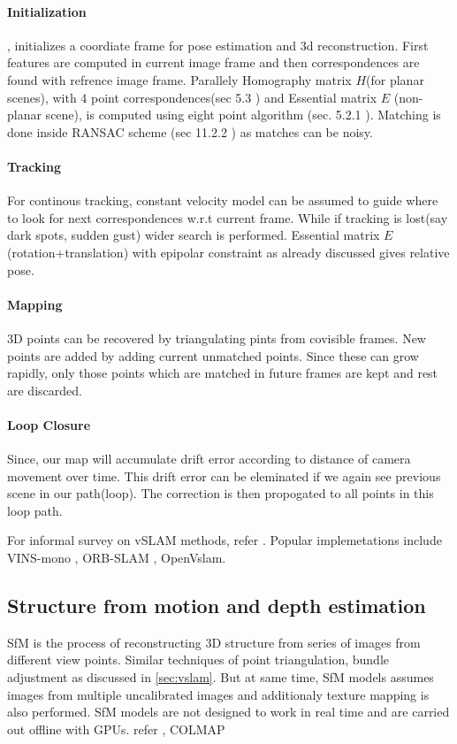 \paragraph{Initialization}, initializes a coordiate frame for pose estimation and 3d reconstruction. First features are computed in current image frame and then correspondences are found with refrence image frame. Parallely Homography matrix $H$(for planar scenes), with 4 point correspondences(sec 5.3 \cite{ma2012invitation}) and Essential matrix $E$ (non-planar scene), is computed using eight 
point algorithm (sec. 5.2.1 \cite{ma2012invitation}). Matching is done inside RANSAC scheme (sec 11.2.2 \cite{ma2012invitation}) as matches can be noisy.

\paragraph{Tracking}
For continous tracking, constant velocity model can be assumed to guide where to look for next correspondences w.r.t current frame. While if tracking is lost(say dark spots, sudden gust) wider search is performed. Essential matrix $E$ (rotation+translation) with epipolar constraint as already discussed gives relative pose.

\paragraph{Mapping}
3D points can be recovered by triangulating pints from covisible frames. New points are added by adding current unmatched points. Since these can grow rapidly, only those points which are matched in future frames are kept and rest are discarded.

\paragraph{Loop Closure}
Since, our map will accumulate drift error according to distance of camera movement over time. This drift error can be eleminated if we again see previous scene in our path(loop). The correction is then propogated to all points in  this loop path.

For informal survey on vSLAM methods, refer \cite{taketomi2017visual}. Popular implemetations include VINS-mono \cite{vins_code:online}\cite{qin2017vins}, ORB-SLAM \cite{orb_code:online} \cite{mur2015orb}, OpenVslam\cite{openvslam_code:online}\cite{openvslam2019}.

\subsection{Structure from motion and depth estimation}
SfM is the process of reconstructing 3D structure from series of images from different view points. Similar techniques of point triangulation, bundle adjustment as discussed in \ref{sec:vslam}. But at same time, SfM models assumes images from multiple uncalibrated images and additionaly texture mapping is also performed. SfM models are not designed to work in real time and are carried out offline with GPUs. refer \cite{schoenberger2016sfm}, COLMAP\cite{colmapco70:online}


